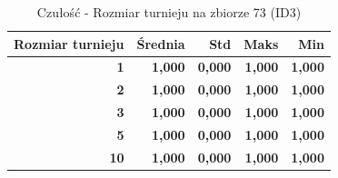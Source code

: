 \begin{table}[htbp]
\centering
\small
\setlength{\tabcolsep}{6pt}
\renewcommand{\arraystretch}{1.2}
\caption{Czułość - Rozmiar turnieju na zbiorze 73 (ID3)}
\label{tab:ID3_tournament_size_73_recall}
\begin{tabular}{r|r|r|r|r}
\toprule
Rozmiar turnieju & Średnia & Std & Maks & Min \\
\hline
\textbf{1} & \textbf{1,000} & \textbf{0,000} & \textbf{1,000} & \textbf{1,000} \\
\textbf{2} & \textbf{1,000} & \textbf{0,000} & \textbf{1,000} & \textbf{1,000} \\
\textbf{3} & \textbf{1,000} & \textbf{0,000} & \textbf{1,000} & \textbf{1,000} \\
\textbf{5} & \textbf{1,000} & \textbf{0,000} & \textbf{1,000} & \textbf{1,000} \\
\textbf{10} & \textbf{1,000} & \textbf{0,000} & \textbf{1,000} & \textbf{1,000} \\
\bottomrule
\end{tabular}
\end{table}